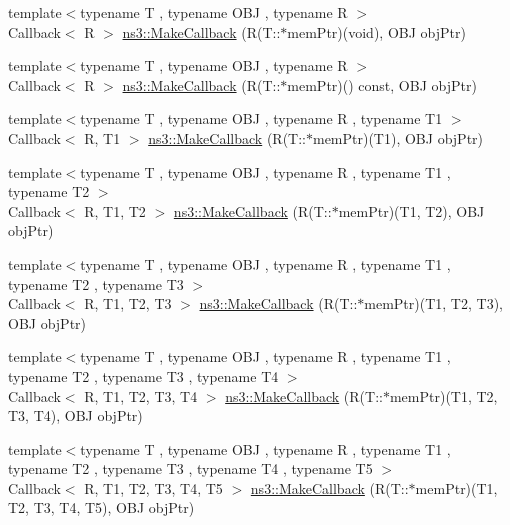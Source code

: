 \begin{DoxyCompactItemize}
\item 
{\footnotesize template$<$typename T , typename O\+BJ , typename R $>$ }\\Callback$<$ R $>$ \hyperlink{group__makecallbackmemptr_ga9376283685aa99d204048d6a4b7610a4}{ns3\+::\+Make\+Callback} (R(T\+::$\ast$mem\+Ptr)(void), O\+BJ obj\+Ptr)
\item 
{\footnotesize template$<$typename T , typename O\+BJ , typename R $>$ }\\Callback$<$ R $>$ \hyperlink{group__makecallbackmemptr_ga9fb9973c335bf84222391f931772c879}{ns3\+::\+Make\+Callback} (R(T\+::$\ast$mem\+Ptr)() const, O\+BJ obj\+Ptr)
\item 
{\footnotesize template$<$typename T , typename O\+BJ , typename R , typename T1 $>$ }\\Callback$<$ R, T1 $>$ \hyperlink{group__makecallbackmemptr_ga9c3562a8b4f37cabc9403c406709349e}{ns3\+::\+Make\+Callback} (R(T\+::$\ast$mem\+Ptr)(T1), O\+BJ obj\+Ptr)
\item 
{\footnotesize template$<$typename T , typename O\+BJ , typename R , typename T1 , typename T2 $>$ }\\Callback$<$ R, T1, T2 $>$ \hyperlink{group__makecallbackmemptr_gab478eaae8e17d651272ecaf6eab5425d}{ns3\+::\+Make\+Callback} (R(T\+::$\ast$mem\+Ptr)(T1, T2), O\+BJ obj\+Ptr)
\item 
{\footnotesize template$<$typename T , typename O\+BJ , typename R , typename T1 , typename T2 , typename T3 $>$ }\\Callback$<$ R, T1, T2, T3 $>$ \hyperlink{group__makecallbackmemptr_ga3221fad2b6c7fece3d5a90fc956e2b4a}{ns3\+::\+Make\+Callback} (R(T\+::$\ast$mem\+Ptr)(T1, T2, T3), O\+BJ obj\+Ptr)
\item 
{\footnotesize template$<$typename T , typename O\+BJ , typename R , typename T1 , typename T2 , typename T3 , typename T4 $>$ }\\Callback$<$ R, T1, T2, T3, T4 $>$ \hyperlink{group__makecallbackmemptr_ga7e89f73a8dedccf0f871a2efccac08d7}{ns3\+::\+Make\+Callback} (R(T\+::$\ast$mem\+Ptr)(T1, T2, T3, T4), O\+BJ obj\+Ptr)
\item 
{\footnotesize template$<$typename T , typename O\+BJ , typename R , typename T1 , typename T2 , typename T3 , typename T4 , typename T5 $>$ }\\Callback$<$ R, T1, T2, T3, T4, T5 $>$ \hyperlink{group__makecallbackmemptr_gaefc016d6de8bf318d8b06a865b02280d}{ns3\+::\+Make\+Callback} (R(T\+::$\ast$mem\+Ptr)(T1, T2, T3, T4, T5), O\+BJ obj\+Ptr)

\end{DoxyCompactItemize}
